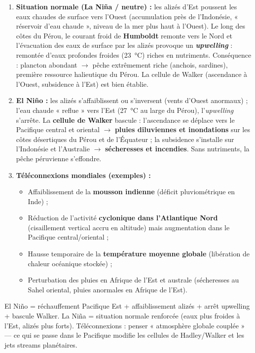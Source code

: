 \documentclass[11pt]{article}
\newcommand{\cle}[1]{{\popxbold\color{popdark}#1}}
\begin{document}
\begin{corrige}
\begin{enumerate}
    \item \textbf{Situation normale (La Niña / neutre) :} les alizés d'Est poussent les eaux chaudes de surface vers l'Ouest (accumulation près de l'Indonésie, « réservoir d'eau chaude », niveau de la mer plus haut à l'Ouest). Le long des côtes du Pérou, le courant froid de \textbf{Humboldt} remonte vers le Nord et l'évacuation des eaux de surface par les alizés provoque un \textbf{\emph{upwelling}} : remontée d'eaux profondes froides (\SI{23}{\celsius}) riches en nutriments. Conséquence : plancton abondant $\rightarrow$ pêche extrêmement riche (anchois, sardines), première ressource halieutique du Pérou. La \cle{cellule de Walker} (ascendance à l'Ouest, subsidence à l'Est) est bien établie.
    \item \textbf{El Niño :} les alizés s'affaiblissent ou s'inversent (vents d'Ouest anormaux) ; l'eau chaude « reflue » vers l'Est (\SI{27}{\celsius} au large du Pérou), l'\emph{upwelling} s'arrête. La \textbf{cellule de Walker} bascule : l'ascendance se déplace vers le Pacifique central et oriental $\rightarrow$ \textbf{pluies diluviennes et inondations} sur les côtes désertiques du Pérou et de l'Équateur ; la subsidence s'installe sur l'Indonésie et l'Australie $\rightarrow$ \textbf{sécheresses et incendies}. Sans nutriments, la pêche péruvienne s'effondre.
    \item \textbf{Téléconnexions mondiales (exemples) :}
    \begin{itemize}
        \item Affaiblissement de la \textbf{mousson indienne} (déficit pluviométrique en Inde) ;
        \item Réduction de l'activité \textbf{cyclonique dans l'Atlantique Nord} (cisaillement vertical accru en altitude) mais augmentation dans le Pacifique central/oriental ;
        \item Hausse temporaire de la \textbf{température moyenne globale} (libération de chaleur océanique stockée) ;
        \item Perturbation des pluies en Afrique de l'Est et australe (sécheresses au Sahel oriental, pluies anormales en Afrique de l'Est).
    \end{itemize}
\end{enumerate}
\end{corrige}

\begin{attention}
El Niño = réchauffement Pacifique Est + affaiblissement alizés + arrêt upwelling + bascule Walker. La Niña = situation normale renforcée (eaux plus froides à l'Est, alizés plus forts). Téléconnexions : penser « atmosphère globale couplée » — ce qui se passe dans le Pacifique modifie les cellules de Hadley/Walker et les jets streams planétaires.
\end{attention}
\end{document}
